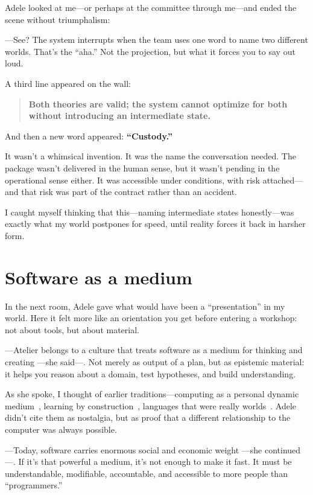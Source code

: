 \documentclass[11pt,a4paper]{article}
\begin{document}
Adele looked at me---or perhaps at the committee through me---and ended the
scene without triumphalism:

---See? The system interrupts when the team uses one word to name two
different worlds. That's the ``aha.'' Not the projection, but what it forces
you to say out loud.

A third line appeared on the wall:

\begin{quote}
\centering
\textbf{Both theories are valid; the system cannot optimize for both without
introducing an intermediate state.}
\end{quote}

And then a new word appeared: \textbf{``Custody.''}

It wasn't a whimsical invention. It was the name the conversation needed. The
package wasn't delivered in the human sense, but it wasn't pending in the
operational sense either. It was accessible under conditions, with risk
attached---and that risk was part of the contract rather than an accident.

I caught myself thinking that this---naming intermediate states
honestly---was exactly what my world postpones for speed, until reality
forces it back in harsher form.

\section{Software as a medium}

In the next room, Adele gave what would have been a ``presentation'' in my
world. Here it felt more like an orientation you get before entering a
workshop: not about tools, but about material.

---Atelier belongs to a culture that treats software as a medium for thinking
and creating ---she said---. Not merely as output of a plan, but as epistemic
material: it helps you reason about a domain, test hypotheses, and build
understanding.

As she spoke, I thought of earlier traditions---computing as a personal
dynamic medium~\cite{kay}, learning by construction~\cite{constructionism},
languages that were really worlds~\cite{ingalls}. Adele didn't cite them as
nostalgia, but as proof that a different relationship to the computer was
always possible.

---Today, software carries enormous social and economic weight ---she
continued---. If it's that powerful a medium, it's not enough to make it
fast. It must be understandable, modifiable, accountable, and accessible to
more people than ``programmers.''
\end{document}
